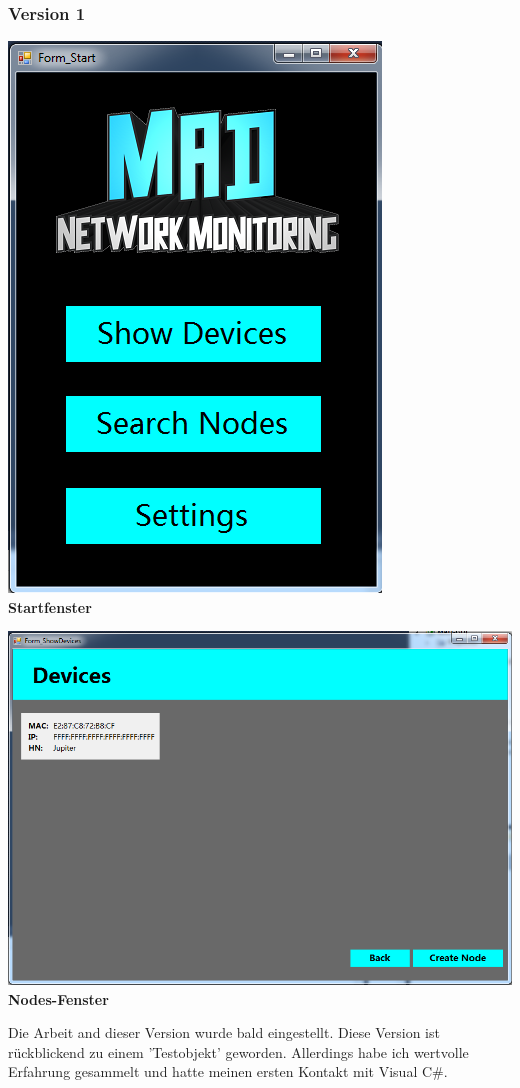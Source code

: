 \documentclass[12pt,a4paper]{report}
\begin{document}
\begin{onehalfspace}
\subsubsection{Version 1}
\begin{center}
\includegraphics[scale=0.5]{../docs/lyaton/graphics/GUI_v1_start.png}\\
\textbf{Startfenster}
\end{center}
\begin{center}
\includegraphics[scale=0.5]{../docs/lyaton/graphics/GUI_v1_nodes.png}\\
\textbf{Nodes-Fenster}
\end{center}
Die Arbeit and dieser Version wurde bald eingestellt. Diese Version ist rückblickend zu einem 'Testobjekt' geworden. Allerdings habe ich wertvolle Erfahrung gesammelt und hatte meinen ersten Kontakt mit Visual C\#.

\end{onehalfspace}
\end{document}
